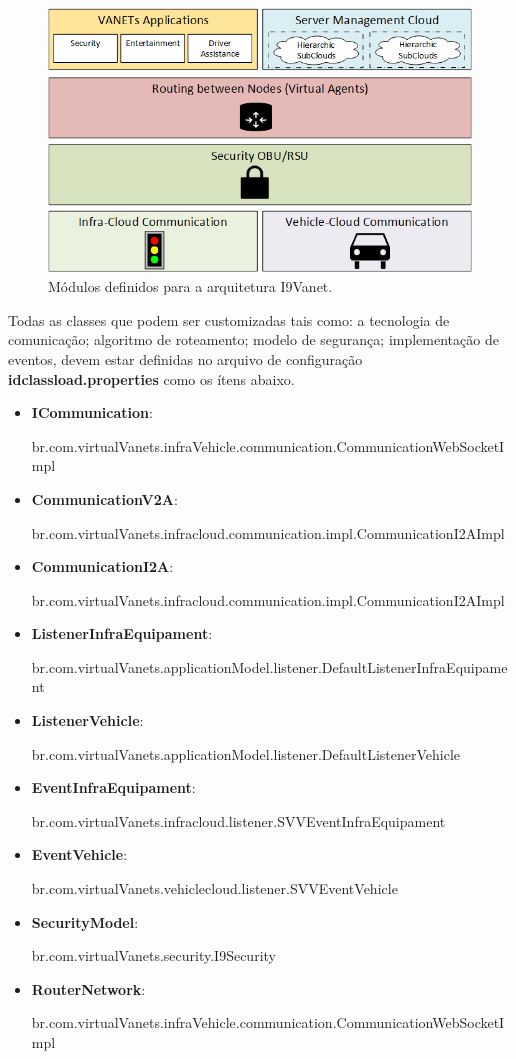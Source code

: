 \documentclass[
	12pt,				%
	oneside,			%
	a4paper,			%
	english,			%
	brazil				%
	]{abntex2ppgsi}
\begin{document}
\begin{figure}[!h]
	\centering
	\includegraphics [width=12cm,height=7cm] {images/modulos.png}
	\caption{Módulos definidos para a arquitetura I9Vanet.}
	\label{fig:dModulos}
\end{figure}

Todas as classes que podem ser customizadas tais como: a tecnologia de comunicação; algoritmo de roteamento; modelo de segurança; implementação de eventos, devem estar definidas no arquivo de configuração \textbf{idclassload.properties} como os ítens abaixo.

\begin{itemize}
	\item{\textbf{ICommunication}:
		
		 br.com.virtualVanets.infraVehicle.communication.CommunicationWebSocketImpl}	

	\item{\textbf{CommunicationV2A}:
		
		br.com.virtualVanets.infracloud.communication.impl.CommunicationI2AImpl}	
	\item{\textbf{CommunicationI2A}:
		
		br.com.virtualVanets.infracloud.communication.impl.CommunicationI2AImpl}	
	\item{\textbf{ListenerInfraEquipament}:
		
		br.com.virtualVanets.applicationModel.listener.DefaultListenerInfraEquipament}	
	\item{\textbf{ListenerVehicle}:
		
		br.com.virtualVanets.applicationModel.listener.DefaultListenerVehicle}	
	\item{\textbf{EventInfraEquipament}:
		
		br.com.virtualVanets.infracloud.listener.SVVEventInfraEquipament}	
	\item{\textbf{EventVehicle}:
		
		br.com.virtualVanets.vehiclecloud.listener.SVVEventVehicle}	
	\item{\textbf{SecurityModel}:
		
		br.com.virtualVanets.security.I9Security}	
	\item{\textbf{RouterNetwork}:
		
		br.com.virtualVanets.infraVehicle.communication.CommunicationWebSocketImpl}	

\end{itemize} 
\end{document}
